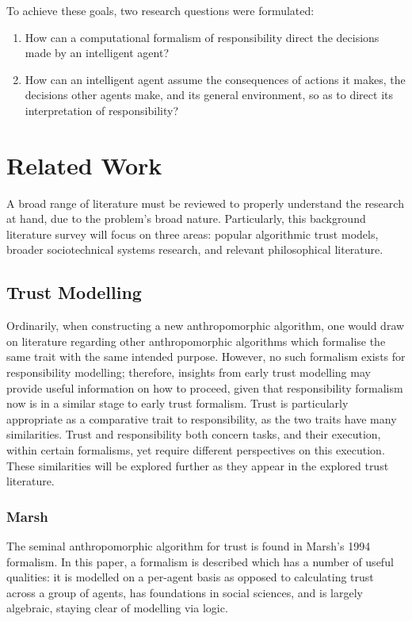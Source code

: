 To achieve these goals, two research questions were formulated:

\begin{enumerate}\label{RQ}
    \item How can a computational formalism of responsibility direct the decisions made by an intelligent agent?
    \item How can an intelligent agent assume the consequences of actions it makes, the decisions other agents make, and its general environment, so as to direct its interpretation of responsibility?
\end{enumerate}\par

\section{Related Work}\label{sec:related_work}
A broad range of literature must be reviewed to properly understand the research at hand, due to the problem's broad nature. Particularly, this background literature survey will focus on three areas: popular algorithmic trust models, broader sociotechnical systems research, and relevant philosophical literature.\par

\subsection{Trust Modelling}
Ordinarily, when constructing a new anthropomorphic algorithm, one would draw on literature regarding other anthropomorphic algorithms which formalise the same trait with the same intended purpose. However, no such formalism exists for responsibility modelling; therefore, insights from early trust modelling may provide useful information on how to proceed, given that responsibility formalism now is in a similar stage to early trust formalism. Trust is particularly appropriate as a comparative trait to responsibility, as the two traits have many similarities. Trust and responsibility both concern tasks, and their execution, within certain formalisms, yet require different perspectives on this execution. These similarities will be explored further as they appear in the explored trust literature.\par

\subsubsection{Marsh}
The seminal anthropomorphic algorithm for trust is found in Marsh's 1994 formalism\cite{Marsh1994FormalisingConcept}. In this paper, a formalism is described which has a number of useful qualities: it is modelled on a per-agent basis as opposed to calculating trust across a group of agents, has foundations in social sciences, and is largely algebraic, staying clear of modelling via logic.

